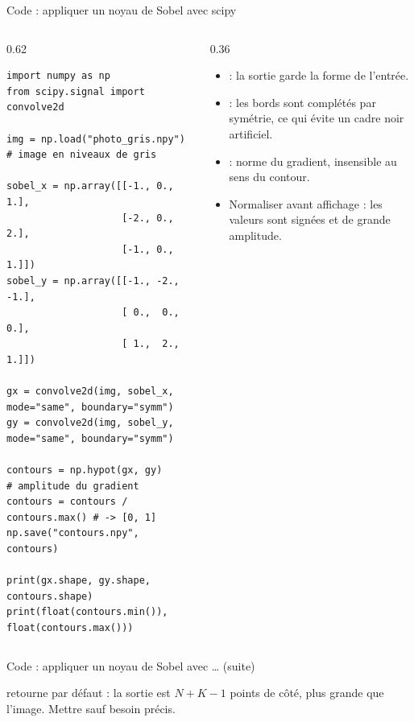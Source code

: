 \begin{frame}[fragile]{Code : appliquer un noyau de Sobel avec scipy}
\begin{columns}[t]
\begin{column}{0.62\textwidth}
\begin{codebox}
\begin{lstlisting}
import numpy as np
from scipy.signal import convolve2d

img = np.load("photo_gris.npy")      # image en niveaux de gris

sobel_x = np.array([[-1., 0., 1.],
                    [-2., 0., 2.],
                    [-1., 0., 1.]])
sobel_y = np.array([[-1., -2., -1.],
                    [ 0.,  0.,  0.],
                    [ 1.,  2.,  1.]])

gx = convolve2d(img, sobel_x, mode="same", boundary="symm")
gy = convolve2d(img, sobel_y, mode="same", boundary="symm")

contours = np.hypot(gx, gy)          # amplitude du gradient
contours = contours / contours.max() # -> [0, 1]
np.save("contours.npy", contours)

print(gx.shape, gy.shape, contours.shape)
print(float(contours.min()), float(contours.max()))
\end{lstlisting}
\end{codebox}
\end{column}
\begin{column}{0.36\textwidth}
\begin{itemize}
  \item {} : la sortie garde la forme de l'entrée.
  \item {} : les bords sont complétés par symétrie, ce qui
  évite un cadre noir artificiel.
  \item {} : norme du gradient, insensible au sens du
  contour.
  \item Normaliser avant affichage : les valeurs sont signées et de grande
  amplitude.
\end{itemize}

\end{column}
\end{columns}
\end{frame}
\begin{frame}{Code : appliquer un noyau de Sobel avec … (suite)}
\begin{wbox}
 retourne  par défaut : la sortie est
$N + K - 1$ points de côté, plus grande que l'image. Mettre
 sauf besoin précis.
\end{wbox}
\end{frame}

